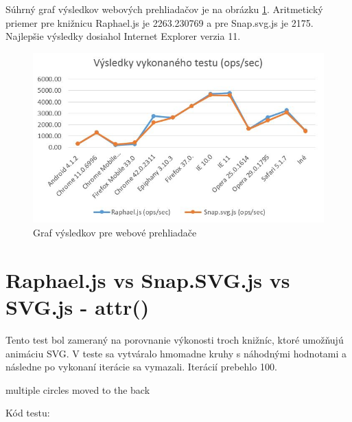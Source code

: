 Súhrný graf výsledkov webových prehliadačov je na obrázku \ref{fig:graf}. Aritmetický priemer pre knižnicu Raphael.js je 2263.230769 a pre Snap.svg.js je 2175. Najlepšie výsledky dosiahol Internet Explorer verzia 11. 

 \begin{figure}[H]
\centering
\includegraphics[width=0.9\linewidth]{obrazky/graf.JPG}
\caption{Graf výsledkov pre webové prehliadače}
\label{fig:graf}
\end{figure}



\section{Raphael.js vs Snap.SVG.js vs SVG.js - attr()}
Tento test bol zameraný na porovnanie výkonosti troch knižníc, ktoré umožňujú animáciu SVG. V teste sa vytváralo hmomadne kruhy s náhodnými hodnotami a následne po vykonaní iterácie sa vymazali. Iterácií prebehlo 100. 

multiple circles moved to the back

Kód testu: 

